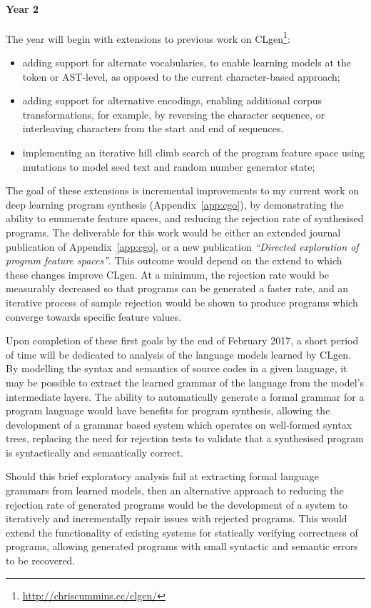 \paragraph{Year 2} The year will begin with extensions to previous work on CLgen\footnote{\url{http://chriscummins.cc/clgen/}}: 
%
\begin{itemize}
        \item adding support for alternate vocabularies, to enable learning models at the token or AST-level, as opposed to the current character-based approach;
        \item adding support for alternative encodings, enabling additional corpus transformations, for example, by reversing the character sequence, or interleaving characters from the start and end of sequences.
        \item implementing an iterative hill climb search of the program feature space using mutations to model seed text and random number generator state;
\end{itemize}
%
The goal of these extensions is incremental improvements to my current work on deep learning program synthesis (Appendix~\ref{app:cgo}), by demonstrating the ability to enumerate feature spaces, and reducing the rejection rate of synthesised programs. The deliverable for this work would be either an extended journal publication of Appendix~\ref{app:cgo}, or a new publication \emph{``Directed exploration of program feature spaces''}. This outcome would depend on the extend to which these changes improve CLgen. At a minimum, the rejection rate would be measurably decreased so that programs can be generated a faster rate, and an iterative process of sample rejection would be shown to produce programs which converge towards specific feature values.

Upon completion of these first goals by the end of February 2017, a short period of time will be dedicated to analysis of the language models learned by CLgen. By modelling the syntax and semantics of source codes in a given language, it may be possible to extract the learned grammar of the language from the model's intermediate layers. The ability to automatically generate a formal grammar for a program language would have benefits for program synthesis, allowing the development of a grammar based system which operates on well-formed syntax trees, replacing the need for rejection tests to validate that a synthesised program is syntactically and semantically correct.

Should this brief exploratory analysis fail at extracting formal language grammars from learned models, then an alternative approach to reducing the rejection rate of generated programs would be the development of a system to iteratively and incrementally repair issues with rejected programs. This would extend the functionality of existing systems for statically verifying correctness of programs, allowing generated programs with small syntactic and semantic errors to be recovered.

